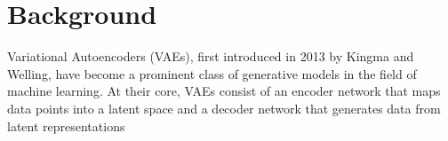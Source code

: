 \chapter{Background}
Variational Autoencoders (VAEs), first introduced in 2013 by Kingma and Welling\cite{kingma2022autoencoding}, have become a prominent class of generative models in the field of machine learning.  At their core, VAEs consist of an encoder network that maps data points into a latent space and a decoder network that generates data from latent representations

